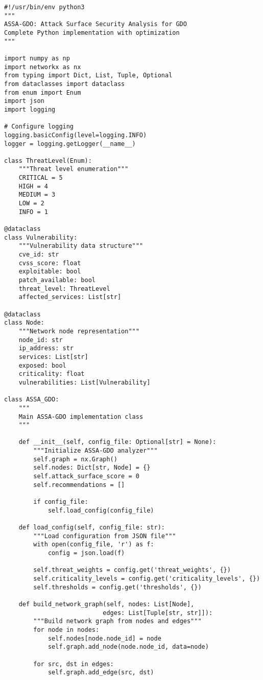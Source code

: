 \begin{verbatim}
#!/usr/bin/env python3
"""
ASSA-GDO: Attack Surface Security Analysis for GDO
Complete Python implementation with optimization
"""

import numpy as np
import networkx as nx
from typing import Dict, List, Tuple, Optional
from dataclasses import dataclass
from enum import Enum
import json
import logging

# Configure logging
logging.basicConfig(level=logging.INFO)
logger = logging.getLogger(__name__)

class ThreatLevel(Enum):
    """Threat level enumeration"""
    CRITICAL = 5
    HIGH = 4
    MEDIUM = 3
    LOW = 2
    INFO = 1

@dataclass
class Vulnerability:
    """Vulnerability data structure"""
    cve_id: str
    cvss_score: float
    exploitable: bool
    patch_available: bool
    threat_level: ThreatLevel
    affected_services: List[str]

@dataclass
class Node:
    """Network node representation"""
    node_id: str
    ip_address: str
    services: List[str]
    exposed: bool
    criticality: float
    vulnerabilities: List[Vulnerability]

class ASSA_GDO:
    """
    Main ASSA-GDO implementation class
    """
    
    def __init__(self, config_file: Optional[str] = None):
        """Initialize ASSA-GDO analyzer"""
        self.graph = nx.Graph()
        self.nodes: Dict[str, Node] = {}
        self.attack_surface_score = 0
        self.recommendations = []
        
        if config_file:
            self.load_config(config_file)
    
    def load_config(self, config_file: str):
        """Load configuration from JSON file"""
        with open(config_file, 'r') as f:
            config = json.load(f)
        
        self.threat_weights = config.get('threat_weights', {})
        self.criticality_levels = config.get('criticality_levels', {})
        self.thresholds = config.get('thresholds', {})
    
    def build_network_graph(self, nodes: List[Node], 
                           edges: List[Tuple[str, str]]):
        """Build network graph from nodes and edges"""
        for node in nodes:
            self.nodes[node.node_id] = node
            self.graph.add_node(node.node_id, data=node)
        
        for src, dst in edges:
            self.graph.add_edge(src, dst)
        

\end{verbatim}
